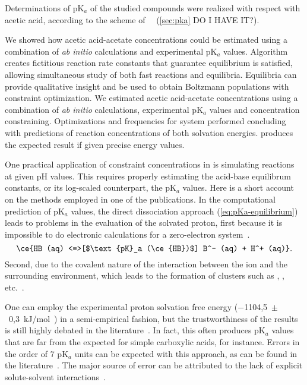 %
\label{sec:pka}

Determinations of pK$_a$ of the studied compounds were realized with respect with acetic acid,
according to the scheme of~\citeauthor{Ding_2009}~\cite{Ding_2009} (\cref{sec:pka} DO I HAVE IT?).


We showed how
acetic acid-acetate concentrations could be estimated using a combination of \emph{ab initio} calculations and experimental pK$_a$ values.
Algorithm creates fictitious reaction rate constants that guarantee equilibrium is satisfied,
allowing simultaneous study of both fast reactions and equilibria.
Equilibria can provide qualitative insight and be used to obtain Boltzmann populations with constraint optimization.
We estimated acetic acid-acetate concentrations using a combination of \emph{ab initio} calculations,
experimental pK$_a$ values and  concentration constraining.
Optimizations and frequencies for  system performed concluding with predictions of reaction concentrations of both solvation energies.
\overreact{} produces the expected result if given precise energy values.

One practical application of constraint concentrations in \overreact{} is simulating reactions at given pH values.
This requires properly estimating the acid-base equilibrum constants,
or its log-scaled counterpart,
the pK$_a$ values.
Here is a short account on the methods employed in one of the publications.
In the computational prediction of pK$_a$ values,
the direct dissociation approach (\cref{eq:pKa-equilibrium})
leads to problems in the evaluation of the solvated proton,
first because it is impossible to do electronic calculations for a zero-electron
system~\cite{Ding_2009,Sumon_2012}.
%
\begin{equation}
	\ce{HB (aq) <=>[$\text{pK}_a (\ce{HB})$] B^- (aq) + H^+ (aq)}\text{.}
	\label{eq:pKa-equilibrium}
\end{equation}
%
Second,
due to the covalent nature of the interaction between the  ion
and the surrounding environment,
which leads to the formation of clusters such
as ,
,
etc.~\cite{Sumon_2012}.

One can employ the experimental proton solvation free energy
($-$1104,5~$\pm$~0,3~kJ/mol~\cite{Tissandier_1998,Marenich_2009}) in a
semi-empirical fashion,
but the trustworthiness of the results is still highly
debated in the literature~\cite{Yang_2013}.
In fact,
this often produces pK$_a$ values that are far from the expected
for simple carboxylic acids,
for instance.
Errors in the order of 7 pK$_a$ units can be expected with this approach,
as can be found in the literature~\cite{Pliego_2002,Ding_2009}.
The major source of error can be attributed to the lack of explicit
solute-solvent interactions~\cite{Pliego_2002}.

